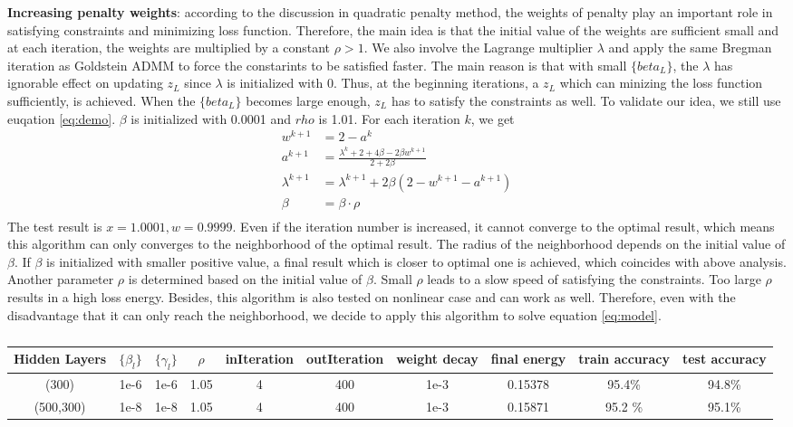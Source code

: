 \documentclass[letterpaper, 10 pt, conference]{ieeeconf}  %
\begin{document}
\textbf{Increasing penalty weights}: according to the discussion in quadratic penalty method, the weights of penalty play an important role in satisfying constraints and minimizing loss function. Therefore, the main idea is that the initial value of the weights are sufficient small and at each iteration, the weights are multiplied by a constant $\rho>1$. We also involve the Lagrange multiplier $\lambda$ and apply the same Bregman iteration as Goldstein ADMM to force the constarints to be satisfied faster. The main reason is that with small $\{beta_L\}$, the $\lambda$ has ignorable effect on updating $z_L$ since $\lambda$ is initialized with 0. Thus, at the beginning iterations, a $z_L$ which can minizing the loss function sufficiently, is achieved. When the $\{beta_L\}$ becomes large enough, $z_L$ has to satisfy the constraints as well. To validate our idea, we still use euqation \eqref{eq:demo}. $\beta$ is initialized with 0.0001 and $rho$ is 1.01. For each iteration $k$, we get
\begin{equation}
\begin{aligned}
w^{k+1} &= 2-a^k \\
a^{k+1} &= \frac{\lambda^k+2+4\beta-2\beta w^{k+1}}{2+2\beta}\\
\lambda^{k+1} &= \lambda^{k+1} + 2\beta(2-w^{k+1}-a^{k+1})\\
\beta &= \beta \cdot \rho \\
\end{aligned}
\label{eq:demoupdate}
\end{equation}
The test result is $x=1.0001, w=0.9999$. Even if the iteration number is increased, it cannot converge to the optimal result, which means this algorithm can only converges to the neighborhood of the optimal result. The radius of the neighborhood depends on the initial value of $\beta$. If $\beta$ is initialized with smaller positive value, a final result which is closer to optimal one is achieved, which coincides with above analysis. Another parameter $\rho$ is determined based on the initial value of $\beta$. Small $\rho$ leads to a slow speed of satisfying the constraints. Too large $\rho$ results in a high loss energy. Besides, this algorithm is also tested on nonlinear case and can work as well. Therefore, even with the disadvantage that it can only reach the neighborhood, we decide to apply this algorithm to solve equation \eqref{eq:model}.

\begin{table}[h]
\centering
\caption{}
\begin{tabular}{|c|c|c|c|c|c|c|c|c|c|}
\hline
	Hidden Layers & $\{\beta_l\}$ & $\{\gamma_l\}$ & $\rho$ & inIteration & outIteration & weight decay & final energy & train accuracy & test accuracy\\
\hline
		(300) & 1e-6 & 1e-6 & 1.05 & 4 & 400 & 1e-3 & 0.15378 & 95.4\% & 94.8\% \\
		(500,300) & 1e-8 & 1e-8 & 1.05 & 4 & 400 & 1e-3 & 0.15871 & 95.2 \% & 95.1\% \\ 
\hline
\end{tabular}
\label{tab:parMNIST}
\end{table}
\end{document}
